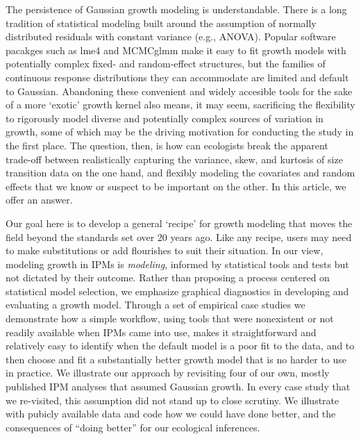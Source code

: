 \documentclass[11pt]{article}
\begin{document}
{The persistence of Gaussian growth modeling is understandable. 
There is a long tradition of statistical modeling built around the assumption of normally distributed residuals with constant variance (e.g., ANOVA).
Popular software pacakges such as lme4 \citep{bates2007lme4} and MCMCglmm \citep{hadfield2010mcmc} make it easy to fit growth models with potentially complex fixed- and random-effect structures, but the families of continuous response distributions they can accommodate are limited and default to Gaussian.
Abandoning these convenient and widely accesible tools for the sake of a more `exotic' growth kernel also means, it may seem, sacrificing the flexibility to rigorously model diverse and potentially complex sources of variation in growth, some of which may be the driving motivation for conducting the study in the first place.
The question, then, is how can ecologists break the apparent trade-off between realistically capturing the variance, skew, and kurtosis of size transition data on the one hand, and flexibly modeling the covariates and random effects that we know or suspect to be important on the other. 
In this article, we offer an answer. 

Our goal here is to develop a general `recipe' for growth modeling that moves the field beyond the standards set over 20 years ago.
Like any recipe, users may need to make substitutions or add flourishes to suit their situation. 
In our view, modeling growth in IPMs is \emph{modeling}, informed by statistical tools and tests but not dictated by their outcome. 
Rather than proposing a process centered on statistical model selection, we emphasize graphical diagnostics in developing and 
evaluating a growth model. 
Through a set of empirical case studies we demonstrate how a simple workflow, using tools 
that were nonexistent or not readily available when IPMs came into use, makes it straightforward and relatively 
easy to identify when the default model is a poor fit to the data, and to then choose and fit a substantially 
better growth model that is no harder to use in practice. 
We illustrate our approach by revisiting four of our own, mostly published IPM analyses that assumed Gaussian growth. 
In every case study that we re-visited, this assumption did not stand up to close scrutiny. 
We illustrate with pubicly available data and code how we could have done better, and the consequences of ``doing better'' for our ecological inferences. 

}
\end{document}
